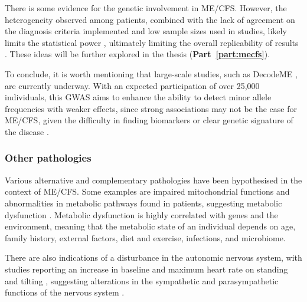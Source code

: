 There is some evidence for the genetic involvement in ME/CFS.
However, the heterogeneity observed among patients, combined with the lack of agreement on the diagnosis criteria implemented and low sample sizes used in studies, likely limits the statistical power \citep{malato2021Statisticalchallenges, malato2023ImpactMisdiagnosis}, ultimately limiting the overall replicability of results \citep{kaiser2006GenesChronic, grabowska2020ReviewQuality}.
These ideas will be further explored in the thesis (\textbf{Part~\ref{part:mecfs}}).

To conclude, it is worth mentioning that large-scale studies, such as DecodeME \citep{devereux-cooke2022DecodeMECommunity}, are currently underway.
With an expected participation of over 25,000 individuals, this GWAS aims to enhance the ability to detect minor allele frequencies with weaker effects, since strong associations may not be the case for ME/CFS, given the difficulty in finding biomarkers \citep{scheibenbogen2017EuropeanME} or clear genetic signature of the disease \citep{tanigawa2019ComponentsGenetic, dibble2020GeneticRisk}.


\subsubsection{Other pathologies}

Various alternative and complementary pathologies have been hypothesised in the context of ME/CFS.
Some examples are impaired mitochondrial functions \citep{nilsson2020MetabolicDysfunction} and abnormalities in metabolic pathways \citep{naviaux2016MetabolicFeatures} found in patients, suggesting metabolic dysfunction \citep{maya2023SurveyingMetabolic}.
Metabolic dysfunction is highly correlated with genes and the environment, meaning that the metabolic state of an individual depends on age, family history, external factors, diet and exercise, infections, and microbiome.

There are also indications of a disturbance in the autonomic nervous system, with studies reporting an increase in baseline and maximum heart rate on standing and tilting \citep{freeman1997DoesChronic}, suggesting alterations in the sympathetic and parasympathetic functions of the nervous system \citep{goldstein2013BetrayalBrain}.

